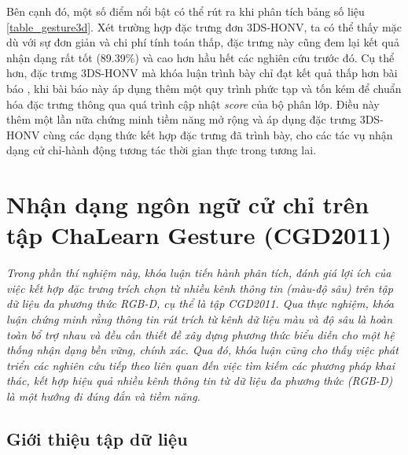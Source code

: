 Bên cạnh đó, một số điểm nổi bật có thể rút ra khi phân tích bảng số liệu \ref{table_gesture3d}. Xét trường hợp đặc trưng đơn 3DS-HONV, ta có thể thấy mặc dù với sự đơn giản và chi phí tính toán thấp, đặc trưng này cũng đem lại kết quả nhận dạng rất tốt (89.39\%) và cao hơn hầu hết các nghiên cứu trước đó. Cụ thể hơn, đặc trưng 3DS-HONV mà khóa luận trình bày chỉ đạt kết quả thấp hơn bài báo \cite{Omar_HON4D}, khi bài báo này áp dụng thêm một quy trình phức tạp và tốn kém để chuẩn hóa đặc trưng thông qua quá trình cập nhật \textit{score} của bộ phân lớp. Điều này thêm một lần nữa chứng minh tiềm năng mở rộng và áp dụng đặc trưng 3DS-HONV cùng các dạng thức kết hợp đặc trưng đã trình bày, cho các tác vụ nhận dạng cử chỉ-hành động tương tác thời gian thực trong tương lai.


\section{Nhận dạng ngôn ngữ cử chỉ trên tập ChaLearn Gesture (CGD2011)\cite{chalearn_dataset}}
\label{chap_5_cgd}
\textit{Trong phần thí nghiệm này, khóa luận tiến hành phân tích, đánh giá lợi ích của việc kết hợp đặc trưng trích chọn từ nhiều kênh thông tin (màu-độ sâu) trên tập dữ liệu đa phương thức RGB-D, cụ thể là tập CGD2011. Qua thực nghiệm, khóa luận chứng minh rằng thông tin rút trích từ kênh dữ liệu màu và độ sâu là hoàn toàn bổ trợ nhau và đều cần thiết đề xây dựng phương thức biểu diễn cho một hệ thống nhận dạng bền vững, chính xác. Qua đó, khóa luận cũng cho thấy việc phát triển các nghiên cứu tiếp theo liên quan đến việc tìm kiếm các phương pháp khai thác, kết hợp hiệu quả nhiều kênh thông tin từ dữ liệu đa phương thức (RGB-D) là một hướng đi đúng đắn và tiềm năng.}
\subsection{Giới thiệu tập dữ liệu}

